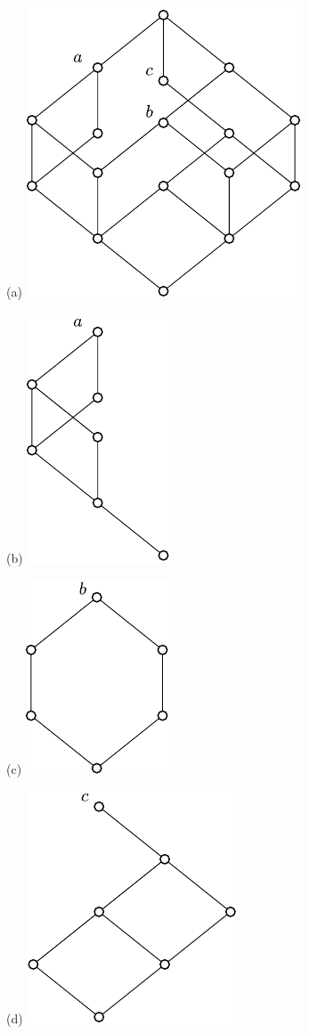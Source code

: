 \documentclass[11pt,a4paper,oneside,titlepage]{alb-corp}
\begin{document}
\begin{description}
  \begin{figure}[!t]
    \begin{albShelve}[b]
    \item[(a)] \includegraphics{down-closure-source.pdf}
    \item[(b)] \includegraphics{down-closure-of-a.pdf}
    \item[(c)] \includegraphics{down-closure-of-b.pdf}
    \item[(d)] \includegraphics{down-closure-of-c.pdf}

\end{albShelve}
\end{figure}
\end{description}
\end{document}
